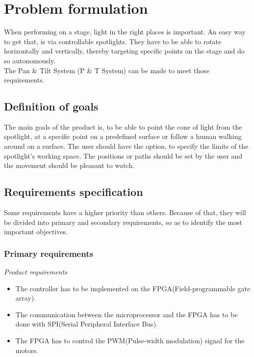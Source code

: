 \newpage

\section{Problem formulation}
When performing on a stage, light in the right places is important. An easy way to get that, is via controllable spotlights. They have to be able to rotate horizontally and vertically, thereby targeting specific points on the stage and do so autonomously.\\
The Pan \& Tilt System (P \& T System) can be made to meet those requirements.
 

\subsection{Definition of goals}
The main goals of the product is, to be able to point the cone of light from the spotlight, at a specific point on a predefined surface or follow a human walking around on a surface. The user should have the option, to specify the limits of the spotlight’s working space. The positions or paths should be set by the user and the movement should be pleasant to watch.


\subsection{Requirements specification}
Some requirements have a higher priority than others. Because of that, they will be divided into primary and secondary requirements, so as to identify the most important objectives.


\subsubsection{Primary requirements}

\textit{Product requirements}

\begin{itemize}

\item The controller has to be implemented on the FPGA(Field-programmable gate array).

\item The communication between the microprocessor and the FPGA has to be done with SPI(Serial Peripheral Interface Bus).

\item The FPGA has to control the PWM(Pulse-width modulation) signal for the motors.
\end{itemize}

